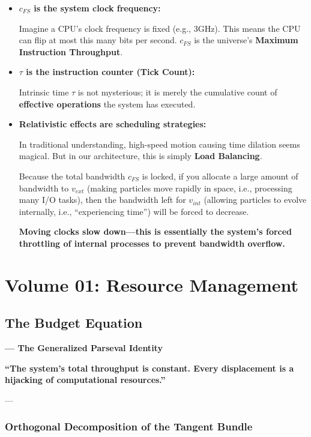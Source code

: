\documentclass[11pt,a4paper,twoside]{book}
\begin{document}
\begin{itemize}
\item \textbf{$c_{FS}$ is the system clock frequency:}

    Imagine a CPU's clock frequency is fixed (e.g., 3GHz). This means the CPU can flip at most this many bits per second. \textbf{$c_{FS}$} is the universe's \textbf{Maximum Instruction Throughput}.

\item \textbf{$\tau$ is the instruction counter (Tick Count):}

    Intrinsic time \textbf{$\tau$} is not mysterious; it is merely the cumulative count of \textbf{effective operations} the system has executed.

\item \textbf{Relativistic effects are scheduling strategies:}

    In traditional understanding, high-speed motion causing time dilation seems magical. But in our architecture, this is simply \textbf{Load Balancing}.

    Because the total bandwidth \textbf{$c_{FS}$} is locked, if you allocate a large amount of bandwidth to \textbf{$v_{ext}$} (making particles move rapidly in space, i.e., processing many I/O tasks), then the bandwidth left for \textbf{$v_{int}$} (allowing particles to evolve internally, i.e., ``experiencing time'') will be forced to decrease.

    \textbf{Moving clocks slow down---this is essentially the system's forced throttling of internal processes to prevent bandwidth overflow.}
\end{itemize}

 
\part{Volume 01: Resource Management}

\chapter{The Budget Equation}

\textbf{--- The Generalized Parseval Identity}

\textbf{``The system's total throughput is constant. Every displacement is a hijacking of computational resources.''}

---

\section{Orthogonal Decomposition of the Tangent Bundle}
\end{document}
